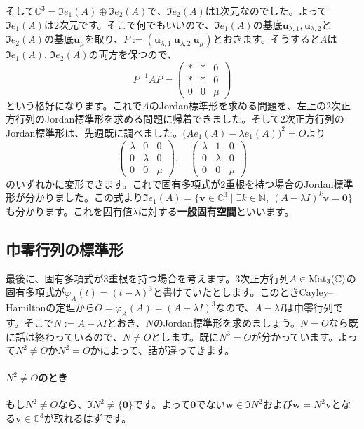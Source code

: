 そして$\mathbb{C}^3 = \Im e_1(A) \oplus \Im e_2(A)$で、$\Im e_2(A)$は$1$次元なのでした。よって$\Im e_1(A)$は$2$次元です。そこで何でもいいので、$\Im e_1(A)$の基底$\bm{u}_{\lambda, 1}, \bm{u}_{\lambda, 2}$と$\Im e_2(A)$の基底$\bm{u}_{\mu}$を取り、$P := (\bm{u}_{\lambda, 1}\ \bm{u}_{\lambda, 2}\ \bm{u}_{\mu})$とおきます。そうすると$A$は$\Im e_1(A)$, $\Im e_2(A)$の両方を保つので、
\[
P^{-1} A P = 
\begin{pmatrix}
* & * & 0 \\
* & * & 0 \\
0 & 0 & \mu
\end{pmatrix}
\]
という格好になります。これで$A$のJordan標準形を求める問題を、左上の$2$次正方行列のJordan標準形を求める問題に帰着できました。そして$2$次正方行列のJordan標準形は、先週既に調べました。$\bigl(Ae_1(A) - \lambda e_1(A)\bigr)^2 = O$より
\[
\begin{pmatrix}
\lambda & 0 & 0 \\
0 & \lambda & 0 \\
0 & 0 & \mu
\end{pmatrix}, \quad
\begin{pmatrix}
\lambda & 1 & 0 \\
0 & \lambda & 0 \\
0 & 0 & \mu
\end{pmatrix}
\]
のいずれかに変形できます。これで固有多項式が$2$重根を持つ場合のJordan標準形が分かりました。この式より$\Im e_1(A) = \{\bm{v} \in \mathbb{C}^3 \mid \exists k \in \mathbb{N},\ (A - \lambda I)^k \bm{v} = \bm{0}\}$も分かります。これを固有値$\lambda$に対する\textbf{一般固有空間}といいます。

\subsection{巾零行列の標準形}

最後に、固有多項式が$3$重根を持つ場合を考えます。$3$次正方行列$A \in \operatorname{Mat}_3(\mathbb{C})$の固有多項式が$\varphi_A(t) = (t - \lambda)^3$と書けていたとします。このときCayley--Hamiltonの定理から$O = \varphi_A(A) = (A - \lambda I)^3$なので、$A - \lambda I$は巾零行列です。そこで$N := A - \lambda I$とおき、$N$のJordan標準形を求めましょう。$N = O$なら既に話は終わっているので、$N \neq O$とします。既に$N^3 = O$が分かっています。よって$N^2 \neq O$か$N^2 = O$かによって、話が違ってきます。

\paragraph{$N^2 \neq O$のとき} もし$N^2 \neq O$なら、$\Im N^2 \neq \{\bm{0}\}$です。よって$\bm{0}$でない$\bm{w} \in \Im N^2$および$\bm{w} = N^2 \bm{v}$となる$\bm{v} \in \mathbb{C}^3$が取れるはずです。

